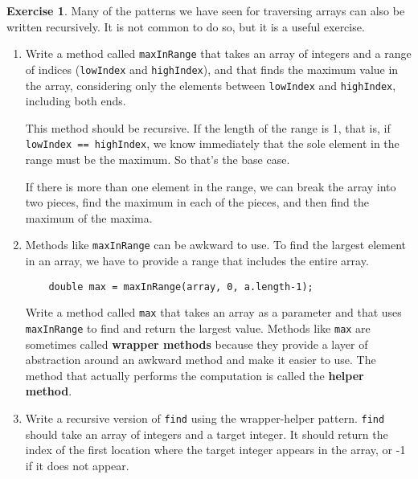 \documentclass[12pt]{book}
\theoremstyle{definition}
\newtheorem{excz}{Exercise}[chapter]
\newenvironment{exercise}{\bigskip\begin{excz}\mbox{}}{\end{excz}}
\begin{document}
\begin{exercise}
Many of the patterns we have seen for traversing arrays can
also be written recursively.  It is not common to do so, but
it is a useful exercise.

\begin{enumerate}

\item Write a method called {\tt maxInRange} that takes an array of
integers and a range of indices ({\tt lowIndex} and {\tt highIndex}),
and that finds the maximum value in the array, considering only the
elements between {\tt lowIndex} and {\tt highIndex}, including both
ends.

This method should be recursive.  If the length of the range is 1,
that is, if {\tt lowIndex == highIndex}, we know immediately that the
sole element in the range must be the maximum.  So that's the base
case.

If there is more than one element in the range, we can break the array
into two pieces, find the maximum in each of the pieces, and then find
the maximum of the maxima.

\item Methods like {\tt maxInRange} can be awkward to use.  To
find the largest element in an array, we have to provide a range
that includes the entire array.

\begin{lstlisting}
    double max = maxInRange(array, 0, a.length-1);
\end{lstlisting}

Write a method called {\tt max} that takes an array as a parameter
and that uses {\tt maxInRange} to find and return the largest value.
Methods like {\tt max} are sometimes called {\bf wrapper methods}
because they provide a layer of abstraction around an awkward method
and make it easier to use.  The method that actually
performs the computation is called the {\bf helper method}.

\item Write a recursive version of {\tt find} using the
wrapper-helper pattern.  {\tt find} should take an array of
integers and a target integer.  It should return the index
of the first location where the target integer appears in the
array, or -1 if it does not appear.

\end{enumerate}
\end{exercise}
\end{document}
